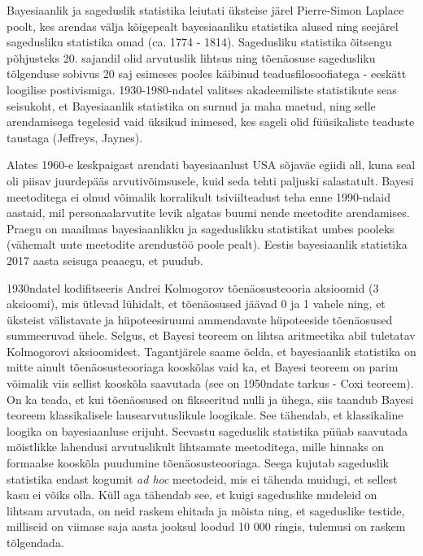 \documentclass[]{book}
\begin{document}
Bayesiaanlik ja sageduslik statistika leiutati üksteise järel Pierre-Simon Laplace poolt, kes arendas välja kõigepealt bayesiaanliku statistika alused ning seejärel sagedusliku statistika omad (ca. 1774 - 1814).
Sagedusliku statistika õitsengu põhjusteks 20. sajandil olid arvutuslik lihtsus ning tõenäosuse sagedusliku tõlgenduse sobivus 20 saj esimeses pooles käibinud teadusfilosoofiatega - eeskätt loogilise postivismiga.
1930-1980-ndatel valitses akadeemiliste statistikute seas seisukoht, et Bayesiaanlik statistika on surnud ja maha maetud, ning selle arendamisega tegelesid vaid üksikud inimesed, kes sageli olid füüsikaliste teaduste taustaga (Jeffreys, Jaynes).

Alates 1960-e keskpaigast arendati bayesiaanlust USA sõjaväe egiidi all, kuna seal oli piisav juurdepääs arvutivõimsusele, kuid seda tehti paljuski salastatult.
Bayesi meetoditega ei olnud võimalik korralikult tsiviilteadust teha enne 1990-ndaid aastaid, mil personaalarvutite levik algatas buumi nende meetodite arendamises.
Praegu on maailmas bayesiaanlikku ja sageduslikku statistikat umbes pooleks (vähemalt uute meetodite arendustöö poole pealt).
Eestis bayesiaanlik statistika 2017 aasta seisuga peaaegu, et puudub.

1930ndatel kodifitseeris Andrei Kolmogorov tõenäosusteooria aksioomid (3 aksioomi), mis ütlevad lühidalt, et tõenäosused jäävad 0 ja 1 vahele ning, et üksteist välistavate ja hüpoteesiruumi ammendavate hüpoteeside tõenäosused summeeruvad ühele.
Selgus, et Bayesi teoreem on lihtsa aritmeetika abil tuletatav Kolmogorovi aksioomidest.
Tagantjärele saame öelda, et bayesiaanlik statistika on mitte ainult tõenäosusteooriaga kooskõlas vaid ka, et Bayesi teoreem on parim võimalik viis sellist kooskõla saavutada (see on 1950ndate tarkus - Coxi teoreem).
On ka teada, et kui tõenäosused on fikseeritud nulli ja ühega, siis taandub Bayesi teoreem klassikalisele lausearvutuslikule loogikale.
See tähendab, et klassikaline loogika on bayesiaanluse erijuht.
Seevastu sageduslik statistika püüab saavutada mõistlikke lahendusi arvutuslikult lihtsamate meetoditega, mille hinnaks on formaalse kooskõla puudumine tõenäosusteooriaga.
Seega kujutab sageduslik statistika endast kogumit \emph{ad hoc} meetodeid, mis ei tähenda muidugi, et sellest kasu ei võiks olla.
Küll aga tähendab see, et kuigi sageduslike mudeleid on lihtsam arvutada, on neid raskem ehitada ja mõista ning, et sageduslike testide, milliseid on viimase saja aasta jooksul loodud 10 000 ringis, tulemusi on raskem tõlgendada.
\end{document}
